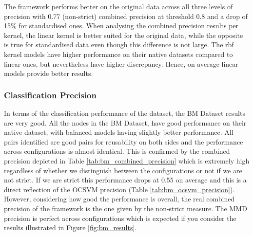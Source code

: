 \documentclass{mpaper}
\begin{document}
The framework performs better on the original data across all three levels of precision with 0.77 (non-strict) combined precision at threshold 0.8 and a drop of 15\% for standardised ones.  When analysing the combined precision results per kernel, the linear kernel is better suited for the original data, while the opposite is true for standardised data even though this difference is not large. The rbf kernel models have higher performance on their native datasets compared to linear ones, but nevertheless have higher discrepancy. Hence, on average linear models provide better results.


\subsubsection{Classification Precision}

In terms of the classification performance of the dataset, the BM Dataset results are very good. All the nodes in the BM Dataset, have good performance on their native dataset, with balanced models having slightly better performance. All pairs identified are good pairs for reusability on both sides and the performance across configurations is almost identical. This is confirmed by the combined precision depicted in Table  \ref{tab:bm_combined_precision} which is extremely high regardless of whether we distinguish between the configurations or not if we are not strict. If we are strict this performance drops at 0.55 on average and this is a direct reflection of the OCSVM precision (Table \ref{tab:bm_ocsvm_precision}). However, considering how good the performance is overall, the real combined precision of the framework is the one given by the non-strict measure. The MMD precision is perfect across configurations which is expected if you consider the results illustrated in Figure \ref{fig:bm_results}. 
\end{document}

